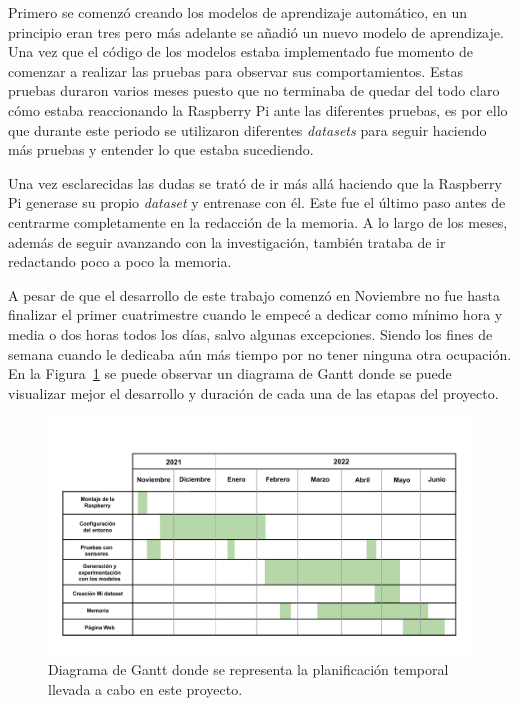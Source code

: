 \documentclass[a4paper, 12pt]{book}
\begin{document}
Primero se comenzó creando los modelos de aprendizaje automático, en un principio eran tres pero más adelante se añadió un nuevo modelo de aprendizaje. Una vez que el código de los modelos estaba implementado fue momento de comenzar a realizar las pruebas para observar sus comportamientos. Estas pruebas duraron varios meses puesto que no terminaba de quedar del todo claro cómo estaba reaccionando la Raspberry Pi ante las diferentes pruebas, es por ello que durante este periodo se utilizaron diferentes \textit{datasets} para seguir haciendo más pruebas y entender lo que estaba sucediendo.

Una vez esclarecidas las dudas se trató de ir más allá haciendo que la Raspberry Pi generase su propio \textit{dataset} y entrenase con él. Este fue el último paso antes de centrarme completamente en la redacción de la memoria. A lo largo de los meses, además de seguir avanzando con la investigación, también trataba de ir redactando poco a poco la memoria.

A pesar de que el desarrollo de este trabajo comenzó en Noviembre no fue hasta finalizar el primer cuatrimestre cuando le empecé a dedicar como mínimo hora y media o dos horas todos los días, salvo algunas excepciones. Siendo los fines de semana cuando le dedicaba aún más tiempo por no tener ninguna otra ocupación. En la Figura~\ref{fig:diagrama_gantt} se puede observar un diagrama de Gantt donde se puede visualizar mejor el desarrollo y duración de cada una de las etapas del proyecto.


\begin{figure}[htb]
  \centering
  \includegraphics[width=17cm, keepaspectratio]{img/diagrama_GANTT.pdf}
  \caption{Diagrama de Gantt donde se representa la planificación temporal llevada a cabo en este proyecto.}\label{fig:diagrama_gantt}
\end{figure}
\end{document}
